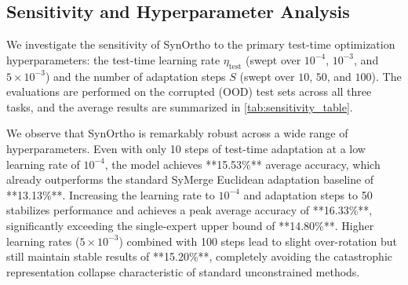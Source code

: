 \documentclass{article}
\theoremstyle{plain}
\theoremstyle{definition}
\theoremstyle{remark}
\begin{document}
\begin{table}[h]
\caption{Ablation Study of SynOrtho components on Clean and Corrupted (OOD) test sets. Jointly optimizing the Lie-algebra merging coefficients and the orthogonal feature adapter (Full SynOrtho) achieves the highest robustness.}
\label{tab:ablation_table}
\vskip 0.1in
\begin{center}
\begin{small}
\begin{sc}
\end{sc}
\end{small}
\end{center}
\vskip -0.1in
\end{table}

\subsection{Sensitivity and Hyperparameter Analysis}
We investigate the sensitivity of SynOrtho to the primary test-time optimization hyperparameters: the test-time learning rate $\eta_{\text{test}}$ (swept over $10^{-4}$, $10^{-3}$, and $5 \times 10^{-3}$) and the number of adaptation steps $S$ (swept over $10$, $50$, and $100$). The evaluations are performed on the corrupted (OOD) test sets across all three tasks, and the average results are summarized in \cref{tab:sensitivity_table}.

We observe that SynOrtho is remarkably robust across a wide range of hyperparameters. Even with only 10 steps of test-time adaptation at a low learning rate of $10^{-4}$, the model achieves **15.53\%** average accuracy, which already outperforms the standard SyMerge Euclidean adaptation baseline of **13.13\%**. Increasing the learning rate to $10^{-4}$ and adaptation steps to 50 stabilizes performance and achieves a peak average accuracy of **16.33\%**, significantly exceeding the single-expert upper bound of **14.80\%**. Higher learning rates ($5\times 10^{-3}$) combined with 100 steps lead to slight over-rotation but still maintain stable results of **15.20\%**, completely avoiding the catastrophic representation collapse characteristic of standard unconstrained methods.
\end{document}
